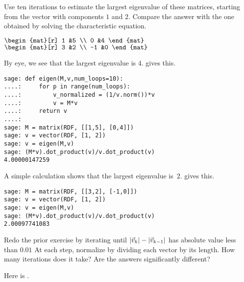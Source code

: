 \begin{exercises}
  \item 
    Use ten iterations to estimate the largest eigenvalue of these
    matrices, starting from the vector with components $1$ and $2$.
    Compare the answer with the one obtained by solving the characteristic
    equation.
    \begin{exparts*}
      \partsitem $\begin{mat}[r]
                    1  &5  \\
                    0  &4
                  \end{mat}$
      \partsitem $\begin{mat}[r]
                    3   &2  \\
                    -1  &0
                  \end{mat}$
    \end{exparts*}
    \begin{answer}
     \begin{exparts}
       \partsitem By eye, we see that the largest eigenvalue is $4$.
         \Sage{} gives this.
\begin{lstlisting}
sage: def eigen(M,v,num_loops=10):
....:     for p in range(num_loops):
....:         v_normalized = (1/v.norm())*v
....:         v = M*v
....:     return v 
....: 
sage: M = matrix(RDF, [[1,5], [0,4]])
sage: v = vector(RDF, [1, 2])
sage: v = eigen(M,v)
sage: (M*v).dot_product(v)/v.dot_product(v)
4.00000147259
\end{lstlisting}
       \partsitem A simple calculation shows that the largest eigenvalue 
          is~$2$.
          \Sage{} gives this.
\begin{lstlisting}
sage: M = matrix(RDF, [[3,2], [-1,0]])
sage: v = vector(RDF, [1, 2])
sage: v = eigen(M,v)
sage: (M*v).dot_product(v)/v.dot_product(v)
2.00097741083
\end{lstlisting}
     \end{exparts}
    \end{answer}
  \item 
     Redo the prior exercise by iterating until 
     $\lvert\vec{v}_k\rvert-\lvert\vec{v}_{k-1}\rvert$ has absolute value less than
     $0.01$
     At each step, normalize by dividing each vector by its length.
     How many iterations does it take?
     Are the answers significantly different?
     \begin{answer}
       \begin{exparts}
         \partsitem Here is \Sage.
 \begin{lstlisting}

\end{lstlisting}
\end{exparts}
\end{answer}
\end{exercises}
